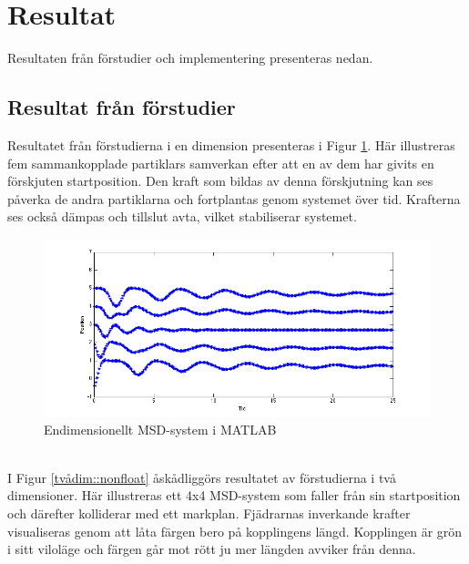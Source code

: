 \documentclass[a4paper,12pt,oneside,final,swedish]{extarticle}
\begin{document}
\section{Resultat}
Resultaten från förstudier och implementering presenteras nedan.
\subsection{Resultat från förstudier}
Resultatet från förstudierna i en dimension presenteras i Figur \ref{endim::nonfloat}. Här illustreras fem sammankopplade partiklars samverkan efter att en av dem har givits en förskjuten startposition. Den kraft som bildas av denna förskjutning kan ses påverka de andra partiklarna och fortplantas genom systemet över tid. Krafterna ses också dämpas och tillslut avta, vilket stabiliserar systemet.

\begin{figure}[h!]
  \begin{center}
    \includegraphics[width=16cm]{Bilder/1D_matlab.png} 
  \end{center}
  \caption{Endimensionellt MSD-system i MATLAB}
  \label{endim::nonfloat}
\end{figure}

\noindent \\I Figur \ref{tvådim::nonfloat} åskådliggörs resultatet av förstudierna i två dimensioner. Här illustreras ett 4x4 MSD-system som faller från sin startposition och därefter kolliderar med ett markplan.
Fjädrarnas inverkande krafter visualiseras genom att låta färgen bero på kopplingens längd. 
Kopplingen är grön i sitt viloläge och färgen går mot rött ju mer längden avviker från denna.
\end{document}
